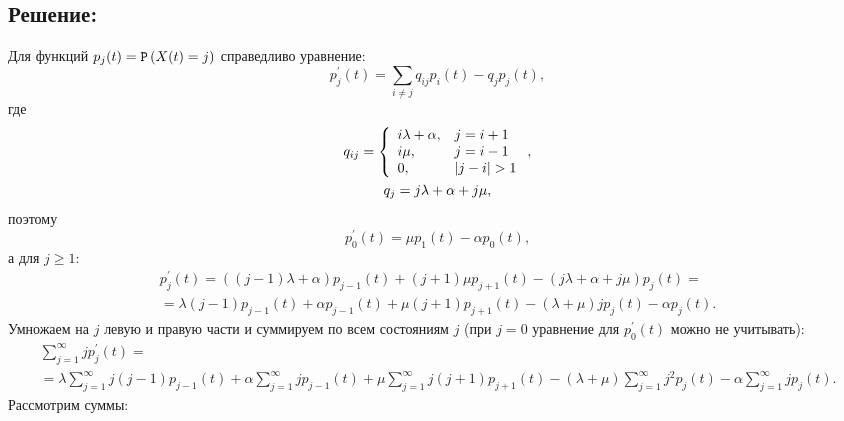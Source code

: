 \documentclass[12pt]{article}
\begin{document}
    \subsection*{Решение:}
    Для функций $p_j(t) = \mathtt{P} \left ( X(t)=j \right )$ справедливо уравнение:
    \[
        p_j^{\prime}(t) = \sum_{i \neq j} q_{ij} p_i(t) - q_j p_j(t),
    \]
    где
    \begin{gather*}
        q_{ij}
        = \left \{
        \begin{array}{ll}
            i \lambda + \alpha, & j = i+1           \\
            i \mu,              & j = i-1           \\
            0,                  & \left | j-i \right | > 1
        \end{array}
        \right . , \\
        q_{j} = j \lambda + \alpha + j \mu ,
    \end{gather*}
    поэтому
    \[
        p_0^{\prime}(t) = \mu p_1(t) - \alpha p_0(t),
    \]
    а для $j \ge 1$:
    \begin{multline*}
        p_j^{\prime}(t)
        = ( (j-1) \lambda + \alpha ) p_{j-1}(t) + (j+1) \mu p_{j+1}(t) - ( j \lambda + \alpha + j \mu ) p_j(t) = \\
        = \lambda (j-1) p_{j-1}(t) + \alpha p_{j-1}(t) + \mu (j+1) p_{j+1}(t) - ( \lambda + \mu ) j p_j(t) - \alpha p_j(t) .
    \end{multline*}
    Умножаем на $j$ левую и правую части и суммируем по всем состояниям $j$ (при $j=0$ уравнение для $p_0^\prime(t)$ можно не учитывать):
    \begin{multline*}
        \sum_{j=1}^\infty j p_j^{\prime}(t) = \\
        = \lambda \sum_{j=1}^\infty j (j-1) p_{j-1}(t) + \alpha \sum_{j=1}^\infty j p_{j-1}(t) + \mu \sum_{j=1}^\infty j (j+1) p_{j+1}(t) - ( \lambda + \mu ) \sum_{j=1}^\infty j^2 p_j(t) - \alpha \sum_{j=1}^\infty j p_j(t).
    \end{multline*}
    Рассмотрим суммы:
\end{document}
